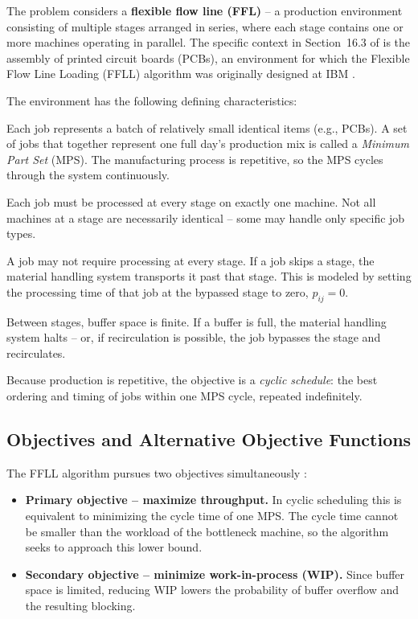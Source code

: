 \documentclass[11pt,a4paper]{article}
\begin{document}
The problem considers a \textbf{flexible flow line (FFL)} -- a production
environment consisting of multiple stages arranged in series, where each
stage contains one or more machines operating in parallel. The specific
context in Section~16.3 of \citet{pinedo2016scheduling} is the assembly
of printed circuit boards (PCBs), an environment for which the Flexible
Flow Line Loading (FFLL) algorithm was originally designed at IBM
\citep{ibm_ffll}.

The environment has the following defining characteristics:

\begin{description}[leftmargin=2.2cm,style=nextline]
  \item[Jobs] Each job represents a batch of relatively small identical
    items (e.g., PCBs). A set of jobs that together represent one full
    day's production mix is called a \emph{Minimum Part Set} (MPS). The
    manufacturing process is repetitive, so the MPS cycles through the
    system continuously.
  \item[Processing] Each job must be processed at every stage on exactly
    one machine. Not all machines at a stage are necessarily identical --
    some may handle only specific job types.
  \item[Bypass] A job may not require processing at every stage. If a job
    skips a stage, the material handling system transports it past that
    stage. This is modeled by setting the processing time of that job at
    the bypassed stage to zero, $p_{ij}=0$.
  \item[Limited buffers] Between stages, buffer space is finite. If a
    buffer is full, the material handling system halts -- or, if
    recirculation is possible, the job bypasses the stage and recirculates.
  \item[Cyclic schedule] Because production is repetitive, the objective
    is a \emph{cyclic schedule}: the best ordering and timing of jobs
    within one MPS cycle, repeated indefinitely.
\end{description}

\subsection{Objectives and Alternative Objective Functions}

The FFLL algorithm pursues two objectives simultaneously
\citep{pinedo2016scheduling}:

\begin{itemize}
  \item \textbf{Primary objective -- maximize throughput.} In cyclic
    scheduling this is equivalent to minimizing the cycle time of one MPS.
    The cycle time cannot be smaller than the workload of the bottleneck
    machine, so the algorithm seeks to approach this lower bound.
  \item \textbf{Secondary objective -- minimize work-in-process (WIP).}
    Since buffer space is limited, reducing WIP lowers the probability of
    buffer overflow and the resulting blocking.
\end{itemize}
\end{document}
